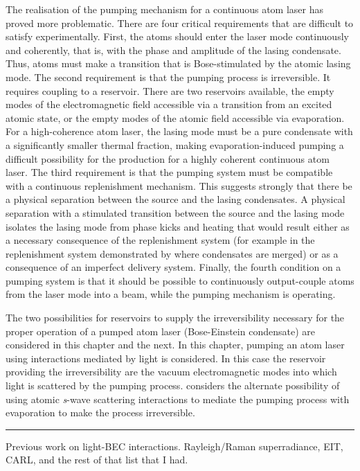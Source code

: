 The realisation of the pumping mechanism for a continuous atom laser has proved more problematic. There are four critical requirements that are difficult to satisfy experimentally. First, the atoms should enter the laser mode continuously and coherently, that is, with the phase and amplitude of the lasing condensate. Thus, atoms must make a transition that is Bose-stimulated by the atomic lasing mode. The second requirement is that the pumping process is irreversible. It requires coupling to a reservoir. There are two reservoirs available, the empty modes of the electromagnetic field accessible via a transition from an excited atomic state, or the empty modes of the atomic field accessible via evaporation. For a high-coherence atom laser, the lasing mode must be a pure condensate with a significantly smaller thermal fraction, making evaporation-induced pumping a difficult possibility for the production for a highly coherent continuous atom laser. The third requirement is that the pumping system must be compatible with a continuous replenishment mechanism. This suggests strongly that there be a physical separation between the source and the lasing condensates. A physical separation with a stimulated transition between the source and the lasing mode isolates the lasing mode from phase kicks and heating that would result either as a necessary consequence of the replenishment system (for example in the replenishment system demonstrated by \citet{Chikkatur:2002qa} where condensates are merged) or as a consequence of an imperfect delivery system. Finally, the fourth condition on a pumping system is that it should be possible to continuously output-couple atoms from the laser mode into a beam, while the pumping mechanism is operating.

The two possibilities for reservoirs to supply the irreversibility necessary for the proper operation of a pumped atom laser (Bose-Einstein condensate) are considered in this chapter and the next. In this chapter, pumping an atom laser using interactions mediated by light is considered. In this case the reservoir providing the irreversibility are the vacuum electromagnetic modes into which light is scattered by the pumping process.  considers the alternate possibility of using atomic \emph{s}-wave scattering interactions to mediate the pumping process with evaporation to make the process irreversible.

\hrule

Previous work on light-BEC interactions. Rayleigh/Raman superradiance, EIT, CARL, and the rest of that list that I had.


